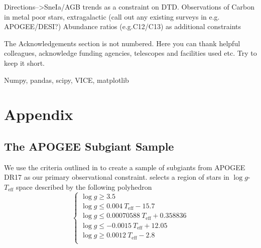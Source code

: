\documentclass[12pt,oneside]{report}
\begin{document}
Directions-->SneIa/AGB trends as a constraint on DTD.
Observations of Carbon in metal poor stars, extragalactic (call out any
existing surveys in e.g. APOGEE/DESI?)
Abundance ratios (e.g.C12/C13) as additional constraints


The Acknowledgements section is not numbered. Here you can thank helpful
colleagues, acknowledge funding agencies, telescopes and facilities used etc.
Try to keep it short.

Numpy, pandas, scipy, VICE, matplotlib
\cite{numpy, matplotlib}

\cite{OhioSupercomputerCenter1987}




\newpage






\appendix
\chapter*{Appendix}
\renewcommand{\thesection}{A.\arabic{section}}
\renewcommand\thefigure{A.\arabic{figure}}    
\setcounter{figure}{0}



\section{The APOGEE Subgiant Sample}\label{sec:jack}

We use the criteria outlined in \cite{jack_subgiant} to create a sample of subgiants from APOGEE DR17 \cite{apogee17} as our primary observational constraint. 
\cite{jack_subgiant} selects a region of stars in $\log g$-$T_\text{eff}$ space described by the following polyhedron
\begin{equation}
\begin{cases}
\log g \geq 3.5 \\
\log g \leq 0.004\ T_\text{eff} - 15.7 \\
\log g \leq 0.00070588\ T_\text{eff} + 0.358836 \\
\log g \leq -0.0015\ T_\text{eff} + 12.05 \\
\log g \geq 0.0012\ T_\text{eff} - 2.8 \\
\end{cases}
\end{equation}
\end{document}
